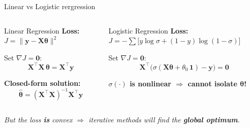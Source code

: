 \documentclass[aspectratio=169,11pt]{beamer}
\begin{document}
\begin{frame}{Linear vs Logistic rergression}
\begin{columns}[T]
\begin{block}{Linear Regression}
\textbf{Loss:} $J = \|\boldsymbol{y}-\mathbf{X}\boldsymbol{\theta}\|^2$

\vspace{0.3em}
Set $\nabla J=\boldsymbol{0}$:
\[
  \mathbf{X}^\top\mathbf{X}\,\boldsymbol{\theta} = \mathbf{X}^\top\boldsymbol{y}
\]

\textbf{Closed-form solution:}
\[
  \hat{\boldsymbol{\theta}} = (\mathbf{X}^\top\mathbf{X})^{-1}\mathbf{X}^\top\boldsymbol{y}
\]
\end{block}

\begin{block}{Logistic Regression}
\textbf{Loss:} $J = -\sum\!\bigl[y\log\sigma+(1{-}y)\log(1{-}\sigma)\bigr]$

\vspace{0.3em}
Set $\nabla J=\boldsymbol{0}$:
\[
  \mathbf{X}^\top\bigl(\sigma(\mathbf{X}\boldsymbol{\theta}+\theta_0\,\boldsymbol{1})-\boldsymbol{y}\bigr) = \boldsymbol{0}
\]

\textbf{\color{red!70} $\sigma(\cdot)$ is nonlinear $\Rightarrow$ cannot isolate $\boldsymbol{\theta}$!}
\end{block}
\end{columns}

\vspace{0.5em}
\centering
\textit{But the loss \textbf{is} convex $\Rightarrow$ iterative methods will find the \textbf{global optimum}.}
\end{frame}

\end{document}
